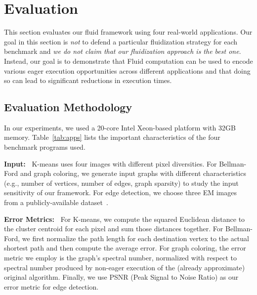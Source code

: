 \section{Evaluation}
\label{sec:evaluation}
This section evaluates our fluid framework using four real-world applications. Our goal in this section is {\em not} to defend a particular fluidization strategy for each benchmark and \textit{we do not claim that our fluidization approach is the best one}. Instead, our goal is to demonstrate that Fluid computation can be used to encode various eager execution opportunities across different applications and that doing so can lead to significant reductions in execution times.

\subsection{Evaluation Methodology}
In our experiments, we used a 20-core Intel Xeon-based platform with 32GB memory. Table~\ref{tab:apps} lists the important characteristics of the four benchmark programs used. 

\noindent\textbf{Input:~} K-means uses four images with different pixel diversities. For Bellman-Ford and graph coloring, we generate input graphs with different characteristics (e.g., number of vertices, number of edges, graph sparsity) to study the input sensitivity of our framework. For edge detection, we choose three EM images from a publicly-available dataset~\cite{unetdataset2,unetdataset}.

\noindent\textbf{Error Metrics:~} For K-means, we compute the squared Euclidean distance to the cluster centroid for each pixel and sum those distances together. For Bellman-Ford, we first normalize the path length for each destination vertex to the actual shortest path and then compute the average error. For graph coloring, the error metric we employ is the graph's spectral number, normalized with respect to spectral number produced by non-eager execution of the (already approximate) original algorithm. Finally, we use PSNR \cite{edgedetect} (Peak Signal to Noise Ratio) as our error metric for edge detection. 

